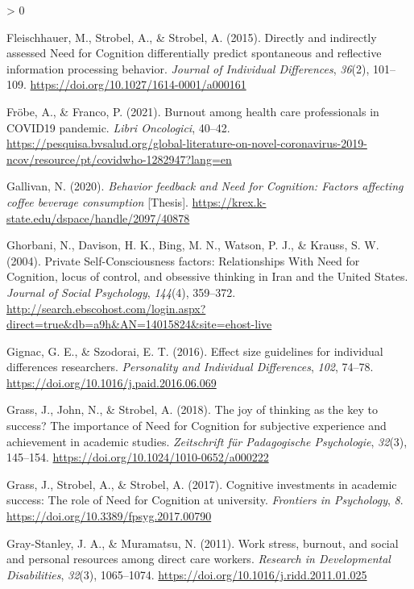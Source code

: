 \documentclass[
  english,
  man,floatsintext]{apa6}
\newlength{\cslhangindent}
\newenvironment{CSLReferences}[2] %
 {%
  \setlength{\parindent}{0pt}
  \ifodd #1 \everypar{\setlength{\hangindent}{\cslhangindent}}\ignorespaces\fi
  \ifnum #2 > 0
  \setlength{\parskip}{#2\baselineskip}
  \fi
 }%
 {}
\begin{document}
\begin{CSLReferences}{1}{0}
\leavevmode\hypertarget{ref-Fleischhauer2015}{}%
Fleischhauer, M., Strobel, A., \& Strobel, A. (2015). Directly and indirectly assessed {Need for Cognition} differentially predict spontaneous and reflective information processing behavior. \emph{Journal of Individual Differences}, \emph{36}(2), 101--109. \url{https://doi.org/10.1027/1614-0001/a000161}

\leavevmode\hypertarget{ref-Froebe2021}{}%
Fröbe, A., \& Franco, P. (2021). Burnout among health care professionals in {COVID19} pandemic. \emph{Libri Oncologici}, 40--42. \url{https://pesquisa.bvsalud.org/global-literature-on-novel-coronavirus-2019-ncov/resource/pt/covidwho-1282947?lang=en}

\leavevmode\hypertarget{ref-Gallivan2020}{}%
Gallivan, N. (2020). \emph{Behavior feedback and {Need} for {Cognition}: {Factors} affecting coffee beverage consumption} {[}Thesis{]}. \url{https://krex.k-state.edu/dspace/handle/2097/40878}

\leavevmode\hypertarget{ref-Ghorbani2004}{}%
Ghorbani, N., Davison, H. K., Bing, M. N., Watson, P. J., \& Krauss, S. W. (2004). Private {Self}-{Consciousness} factors: {Relationships} {With} {Need} for {Cognition}, locus of control, and obsessive thinking in {Iran} and the {United} {States}. \emph{Journal of Social Psychology}, \emph{144}(4), 359--372. \url{http://search.ebscohost.com/login.aspx?direct=true\&db=a9h\&AN=14015824\&site=ehost-live}

\leavevmode\hypertarget{ref-Gignac2016}{}%
Gignac, G. E., \& Szodorai, E. T. (2016). Effect size guidelines for individual differences researchers. \emph{Personality and Individual Differences}, \emph{102}, 74--78. \url{https://doi.org/10.1016/j.paid.2016.06.069}

\leavevmode\hypertarget{ref-Grass2018}{}%
Grass, J., John, N., \& Strobel, A. (2018). The joy of thinking as the key to success? {The} importance of {Need} for {Cognition} for subjective experience and achievement in academic studies. \emph{Zeitschrift für Padagogische Psychologie}, \emph{32}(3), 145--154. \url{https://doi.org/10.1024/1010-0652/a000222}

\leavevmode\hypertarget{ref-Grass2017}{}%
Grass, J., Strobel, A., \& Strobel, A. (2017). Cognitive investments in academic success: {The} role of {Need} for {Cognition} at university. \emph{Frontiers in Psychology}, \emph{8}. \url{https://doi.org/10.3389/fpsyg.2017.00790}

\leavevmode\hypertarget{ref-GrayStanley2011}{}%
Gray-Stanley, J. A., \& Muramatsu, N. (2011). Work stress, burnout, and social and personal resources among direct care workers. \emph{Research in Developmental Disabilities}, \emph{32}(3), 1065--1074. \url{https://doi.org/10.1016/j.ridd.2011.01.025}


\end{CSLReferences}
\end{document}
